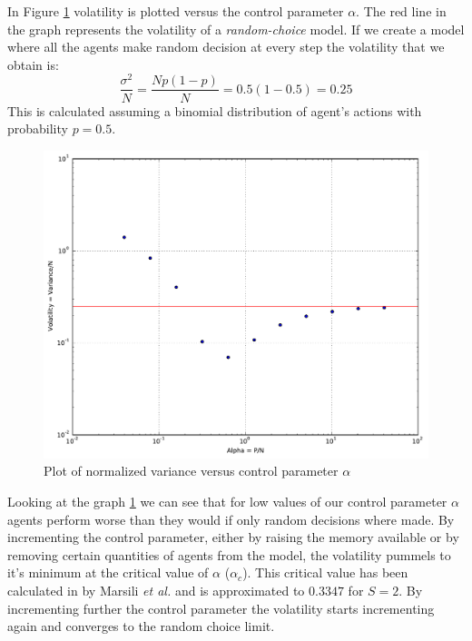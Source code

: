In Figure \ref{fig:normalized variance} volatility is plotted versus the control parameter $\alpha$.
The red line in the graph represents the volatility of a \textit{random-choice} model.
If we create a model where all the agents make random decision at every step the volatility that we obtain is:
\begin{displaymath}
\frac{\sigma^2}{N} = \frac{Np(1-p)}{N} = 0.5(1-0.5) = 0.25
\end{displaymath}
This is calculated assuming a binomial distribution of agent's actions with probability $p=0.5$.

\begin{figure}[h]
\begin{center}
\includegraphics[scale=0.4]{images/minority/alpha_to_norm_var.pdf}
\caption{Plot of normalized variance versus control parameter $\alpha$}
\label{fig:normalized variance}
\end{center}
\end{figure}

Looking at the graph \ref{fig:normalized variance} we can see that for low values of our control parameter $\alpha$ agents perform worse than they would if only random decisions where made.
By incrementing the control parameter, either by raising the memory available or by removing certain quantities of agents from the model, the volatility pummels to it's minimum at the critical value of $\alpha$ ($\alpha_c$).
This critical value has been calculated in \cite{marsili2000exact} by Marsili \textit{et al.} and is approximated to $0.3347$ for $S=2$.
By incrementing further the control parameter the volatility starts incrementing again and converges to the random choice limit.

